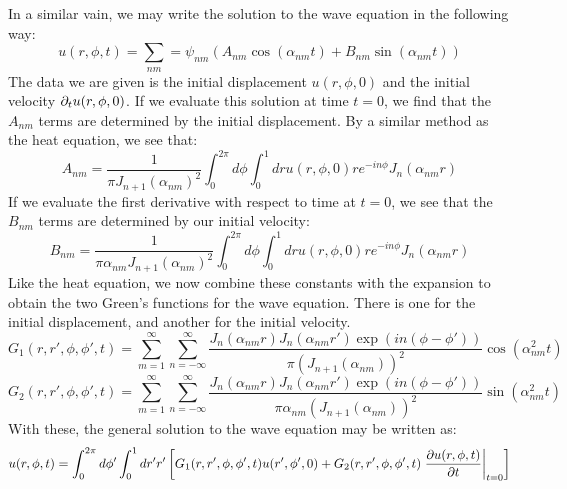 \documentclass{article}
\begin{document}
In a similar vain, we may write the solution to the wave equation in the following way:
\begin{equation}
u(r,\phi,t) = \sum_{nm} = \psi_{nm}(A_{nm}\cos(\alpha_{nm} t)+B_{nm}\sin(\alpha_{nm}t))
\end{equation}
The data we are given is the initial displacement $u(r,\phi,0)$ and the initial velocity $\partial_{t} u(r,\phi,0)$. If we evaluate this solution at time $t=0$, we find that the $A_{nm}$ terms are determined by the initial displacement. By a similar method as the heat equation, we see that:
\begin{equation}
  A_{nm} = \frac{1}{\pi J_{n+1}(\alpha_{nm})^2}\int_0^{2\pi} d\phi\int_0^1 dr u(r,\phi,0) r e^{- i n \phi}J_n(\alpha_{nm} r)
\end{equation}
If we evaluate the first derivative with respect to time at $t=0$, we see that the $B_{nm}$ terms are determined by our initial velocity:
\begin{equation}
  B_{nm} = \frac{1}{\pi\alpha_{nm} J_{n+1}(\alpha_{nm})^2}\int_0^{2\pi} d\phi\int_0^1 dr u(r,\phi,0) r e^{- i n \phi}J_n(\alpha_{nm} r)
\end{equation}
Like the heat equation, we now combine these constants with the expansion to obtain the two Green's functions for the wave equation. There is one for the initial displacement, and another for the initial velocity.
\begin{equation}
  \boxed{
    \boxed{
      G_1(r,r',\phi,\phi',t) = \sum_{m = 1}^\infty \sum_{n = -\infty} ^\infty 
      \frac{J_n(\alpha_{nm} r) J_n(\alpha_{nm} r') \exp\left(i n(\phi - \phi')\right) }{\pi \left(J_{n+1}(\alpha_{nm})\right)^2}\cos\left(\alpha_{nm}^2 t\right)
    }
  }
\end{equation}
\begin{equation}
  \boxed{
    \boxed{
      G_2(r,r',\phi,\phi',t) = \sum_{m = 1}^\infty \sum_{n = -\infty} ^\infty 
      \frac{J_n(\alpha_{nm} r) J_n(\alpha_{nm} r') \exp\left(i n(\phi - \phi')\right) }{\pi \alpha_{nm}\left(J_{n+1}(\alpha_{nm})\right)^2}\sin\left(\alpha_{nm}^2 t\right)
    }
  }
\end{equation}
With these, the general solution to the wave equation may be written as:
\begin{equation}
  u(r,\phi,t) = \int_0^{2\pi} d\phi' \int_0^1 dr' r' \left[G_1(r,r',\phi,\phi',t) u(r',\phi',0)+ G_2(r,r',\phi,\phi',t) \left.\frac{\partial u(r,\phi,t)}{\partial t}\right|_{t=0}\right]
\end{equation}
\end{document}
